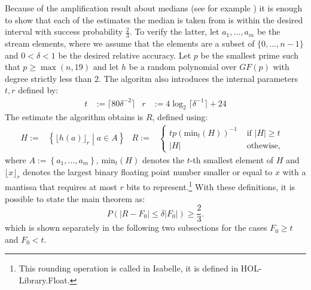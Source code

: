 \documentclass[11pt,a4paper]{article}
\newcommand{\size}[1]{\lvert#1\rvert}
\begin{document}
Because of the amplification result about medians (see for example \cite[]{alon1999}) it is enough to show that each of the estimates the median is taken from is within the desired interval with success probability $\frac{2}{3}$.
To verify the latter, let $a_1, \ldots, a_m$ be the stream elements, where we assume that the elements are a subset of $\{0,\ldots,n-1\}$ and $0 < \delta < 1$ be the desired relative accuracy.
Let $p$ be the smallest prime such that $p \geq \max (n,19)$ and let $h$ be a random polynomial over $GF(p)$ with degree strictly less than $2$.
The algoritm also introduces the internal parameters $t, r$ defined by:
\begin{align*}
    t & := \lceil 80\delta^{-2} \rceil &
    r & := 4 \log_2 \lceil \delta^{-1} \rceil + 24
\end{align*}
The estimate the algorithm obtains is $R$, defined using:
\begin{align*}
    H := & \left\{ \lfloor h(a) \rfloor_r \middle \vert a \in A \right\} &
    R := & \begin{cases} t p \left(\mathrm{min}_t (H) \right)^{-1} & \textrm{ if } \size{H} \geq t \\
    \size{H} & \textrm{ othewise,} \end{cases} &
\end{align*}
where $A := \left\{ a_1, \ldots, a_m \right\}$, $\mathrm{min}_t(H)$ denotes the $t$-th smallest element of $H$ and $\lfloor x \rfloor_r$ denotes the largest binary floating point number smaller or equal to $x$ with a mantissa that requires at most $r$ bits to represent.\footnote{This rounding operation is called  in Isabelle, it is defined in HOL\nobreakdash-Library.Float.}
With these definitions, it is possible to state the main theorem as:
\[
    P(\size{R - F_0} \leq \delta \size{F_0}) \geq \frac{2}{3} \textrm{.}  
\]
which is shown separately in the following two subsections for the cases $F_0 \geq t$ and $F_0 < t$.
\end{document}

